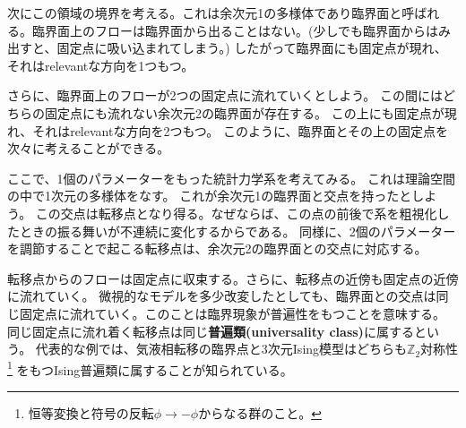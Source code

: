\documentclass[\main/main.tex]{subfiles}
\begin{document}
次にこの領域の境界を考える。これは余次元1の多様体であり臨界面と呼ばれる。臨界面上のフローは臨界面から出ることはない。(少しでも臨界面からはみ出すと、固定点に吸い込まれてしまう。)
したがって臨界面にも固定点が現れ、それはrelevantな方向を1つもつ。

さらに、臨界面上のフローが2つの固定点に流れていくとしよう。
この間にはどちらの固定点にも流れない余次元2の臨界面が存在する。
この上にも固定点が現れ、それはrelevantな方向を2つもつ。
このように、臨界面とその上の固定点を次々に考えることができる。

ここで、1個のパラメーターをもった統計力学系を考えてみる。
これは理論空間の中で1次元の多様体をなす。
これが余次元1の臨界面と交点を持ったとしよう。
この交点は転移点となり得る。なぜならば、この点の前後で系を粗視化したときの振る舞いが不連続に変化するからである。
同様に、2個のパラメーターを調節することで起こる転移点は、余次元2の臨界面との交点に対応する。

転移点からのフローは固定点に収束する。さらに、転移点の近傍も固定点の近傍に流れていく。
微視的なモデルを多少改変したとしても、臨界面との交点は同じ固定点に流れていく。このことは臨界現象が普遍性をもつことを意味する。
同じ固定点に流れ着く転移点は同じ\textbf{普遍類(universality class)}に属するという。
代表的な例では、気液相転移の臨界点と3次元Ising模型はどちらも$ℤ_2$対称性
\footnote{
    恒等変換と符号の反転$ϕ → -ϕ$からなる群のこと。
}
をもつIsing普遍類に属することが知られている。
\end{document}
